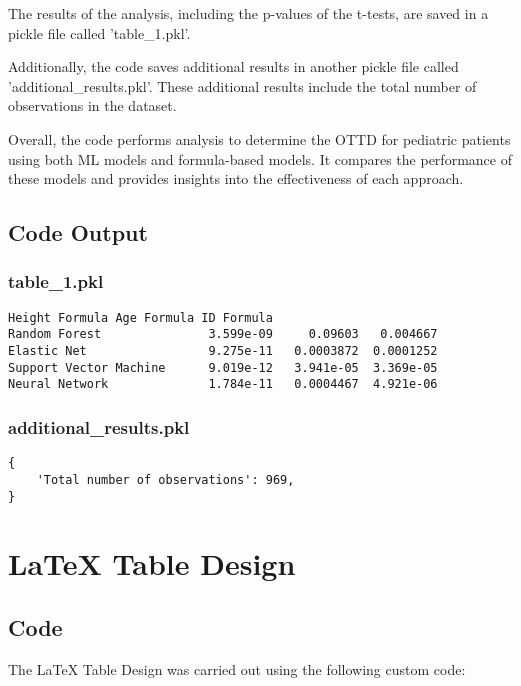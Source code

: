 \documentclass[11pt]{article}
\begin{document}
The results of the analysis, including the p-values of the t-tests, are saved in a pickle file called 'table\_1.pkl'.

Additionally, the code saves additional results in another pickle file called 'additional\_results.pkl'. These additional results include the total number of observations in the dataset.

Overall, the code performs analysis to determine the OTTD for pediatric patients using both ML models and formula-based models. It compares the performance of these models and provides insights into the effectiveness of each approach.

\subsection{Code Output}

\subsubsection*{table\_1.pkl}

\begin{Verbatim}[tabsize=4]
                       Height Formula Age Formula ID Formula
Random Forest               3.599e-09     0.09603   0.004667
Elastic Net                 9.275e-11   0.0003872  0.0001252
Support Vector Machine      9.019e-12   3.941e-05  3.369e-05
Neural Network              1.784e-11   0.0004467  4.921e-06
\end{Verbatim}

\subsubsection*{additional\_results.pkl}

\begin{Verbatim}[tabsize=4]
{
    'Total number of observations': 969,
}
\end{Verbatim}

\section{LaTeX Table Design}
\subsection{{Code}}
The LaTeX Table Design was carried out using the following custom code:
\end{document}
